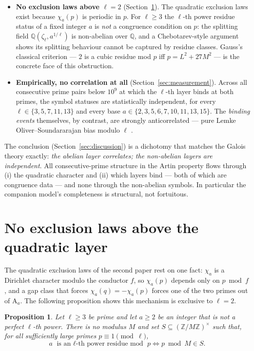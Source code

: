 \documentclass[11pt,reqno]{amsart}
\theoremstyle{plain}
\newtheorem{proposition}[theorem]{Proposition}
\theoremstyle{definition}
\newcommand{\Art}{\mathrm{A}}
\newcommand{\Z}{\mathbb{Z}}
\newcommand{\Q}{\mathbb{Q}}
\begin{document}
\begin{itemize}
\item \textbf{No exclusion laws above $\ell = 2$}
      (Section~\ref{sec:noexclusion}). The quadratic exclusion laws exist
      because $\chi_a(p)$ is periodic in $p$. For $\ell \ge 3$ the $\ell$-th
      power residue status of a fixed integer $a$ is \emph{not} a congruence
      condition on $p$: the splitting field $\Q(\zeta_\ell, a^{1/\ell})$ is
      non-abelian over $\Q$, and a Chebotarev-style argument shows its
      splitting behaviour cannot be captured by residue classes. Gauss's
      classical criterion --- $2$ is a cubic residue mod $p$ iff
      $p = L^2 + 27M^2$ --- is the concrete face of this obstruction.
\item \textbf{Empirically, no correlation at all}
      (Section~\ref{sec:measurement}). Across all consecutive prime pairs
      below $10^9$ at which the $\ell$-th layer binds at both primes, the
      symbol statuses are statistically independent, for every
      $\ell \in \{3, 5, 7, 11, 13\}$ and every base
      $a \in \{2,3,5,6,7,10,11,13,15\}$. The \emph{binding events}
      themselves, by contrast, are strongly anticorrelated --- pure Lemke
      Oliver--Soundararajan bias modulo $\ell$ \cite{LOS2016}.
\end{itemize}

The conclusion (Section~\ref{sec:discussion}) is a dichotomy that matches
the Galois theory exactly: \emph{the abelian layer correlates; the
non-abelian layers are independent}. All consecutive-prime structure in the
Artin property flows through (i) the quadratic character and (ii) which
layers bind --- both of which are congruence data --- and none through the
non-abelian symbols. In particular the companion model's completeness is
structural, not fortuitous.

\section{No exclusion laws above the quadratic layer}
\label{sec:noexclusion}

The quadratic exclusion laws of the second paper rest on one fact: $\chi_a$
is a Dirichlet character modulo the conductor $f$, so $\chi_a(p)$ depends
only on $p \bmod f$, and a gap class that forces $\chi_a(q) = -\chi_a(p)$
forces one of the two primes out of $\Art_a$. The following proposition
shows this mechanism is exclusive to $\ell = 2$.

\begin{proposition}
\label{prop:nonabelian}
Let $\ell \ge 3$ be prime and let $a \ge 2$ be an integer that is not a
perfect $\ell$-th power. There is no modulus $M$ and set
$S \subseteq (\Z/M\Z)^\times$ such that, for all sufficiently large primes
$p \equiv 1 \pmod \ell$,
\[
  a \text{ is an $\ell$-th power residue mod } p
  \iff p \bmod M \in S .
\]
\end{proposition}
\end{document}
